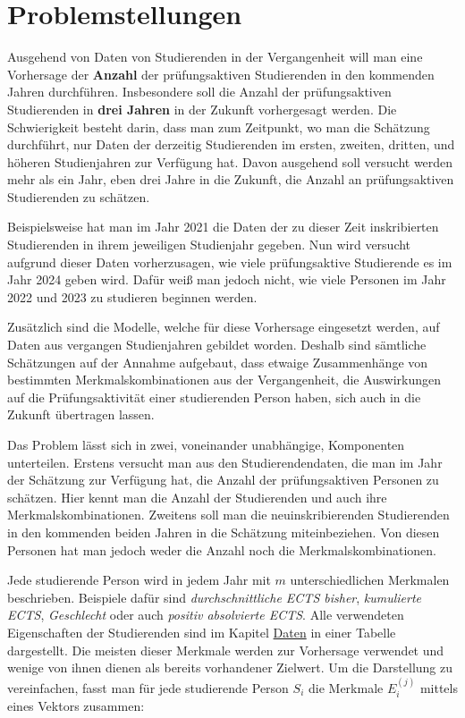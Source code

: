 


\section{Problemstellungen}

Ausgehend von Daten von Studierenden in der Vergangenheit will man eine Vorhersage der \textbf{Anzahl} der prüfungsaktiven Studierenden in den kommenden
Jahren durchf\"uhren. Insbesondere soll die Anzahl der pr\"ufungsaktiven Studierenden in \textbf{drei Jahren} in der Zukunft vorhergesagt werden.
Die Schwierigkeit besteht darin, dass man zum Zeitpunkt, wo man die Schätzung durchf\"uhrt, nur Daten der derzeitig Studierenden im ersten, zweiten, dritten,
und h\"oheren Studienjahren zur Verfügung hat.
Davon ausgehend soll versucht werden mehr als ein Jahr, eben drei Jahre in die Zukunft, die Anzahl an prüfungsaktiven Studierenden zu schätzen.

Beispielsweise hat man im Jahr 2021 die Daten der zu dieser Zeit inskribierten Studierenden in ihrem jeweiligen Studienjahr gegeben. Nun wird versucht aufgrund dieser Daten
vorherzusagen, wie viele pr\"ufungsaktive Studierende es im Jahr 2024 geben wird. Daf\"ur wei{\ss} man jedoch nicht, wie viele Personen im Jahr 2022 und 2023 zu studieren
beginnen werden.

Zus\"atzlich sind die Modelle, welche f\"ur diese Vorhersage eingesetzt werden, auf Daten aus vergangen Studienjahren gebildet worden.
Deshalb sind s\"amtliche Sch\"atzungen auf der Annahme aufgebaut, dass etwaige Zusammenh\"ange von bestimmten Merkmalskombinationen aus der Vergangenheit,
die Auswirkungen auf die Pr\"ufungsaktivit\"at einer studierenden Person haben, sich auch in die Zukunft \"ubertragen lassen.

Das Problem l\"asst sich in zwei, voneinander unabh\"angige, Komponenten unterteilen. Erstens versucht man aus den Studierendendaten, die man im Jahr
der Sch\"atzung zur Verf\"ugung hat, die Anzahl der pr\"ufungsaktiven Personen zu sch\"atzen. Hier kennt man die Anzahl der Studierenden und auch ihre
Merkmalskombinationen. Zweitens soll man die neuinskribierenden Studierenden in den kommenden beiden Jahren in die Sch\"atzung miteinbeziehen. Von diesen Personen
hat man jedoch weder die Anzahl noch die Merkmalskombinationen.



Jede studierende Person wird in jedem Jahr mit $m$ unterschiedlichen Merkmalen beschrieben. Beispiele daf\"ur sind \textit{\glqq durchschnittliche ECTS bisher\grqq{}},
\textit{\glqq kumulierte ECTS\grqq{}}, \textit{\glqq Geschlecht\grqq{}} oder auch \textit{\glqq positiv absolvierte ECTS\grqq{}}. Alle verwendeten Eigenschaften der
Studierenden sind im Kapitel \hyperref[sec:daten]{Daten} in einer Tabelle dargestellt. Die meisten dieser Merkmale werden zur
Vorhersage verwendet und wenige von ihnen dienen als bereits vorhandener Zielwert. Um die Darstellung zu vereinfachen, fasst man f\"ur
jede studierende Person $S_i$ die Merkmale $E_i^{(j)}$ mittels eines Vektors zusammen:

